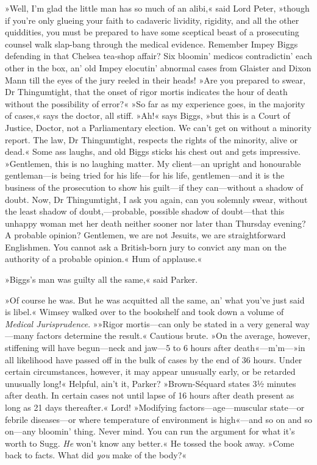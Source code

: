 »Well, I'm glad the little man has so much of an alibi,« said Lord Peter, »though if you're only glueing your faith to cadaveric lividity, rigidity, and all the other quiddities, you must be prepared to have some sceptical beast of a prosecuting counsel walk slap-bang through the medical evidence. Remember Impey Biggs defending in that Chelsea tea-shop affair? Six bloomin' medicos contradictin' each other in the box, an' old Impey elocutin' abnormal cases from Glaister and Dixon Mann till the eyes of the jury reeled in their heads! »Are you prepared to swear, Dr Thingumtight, that the onset of rigor mortis indicates the hour of death without the possibility of error?« »So far as my experience goes, in the majority of cases,« says the doctor, all stiff. »Ah!« says Biggs, »but this is a Court of Justice, Doctor, not a Parliamentary election. We can't get on without a minority report. The law, Dr Thingumtight, respects the rights of the minority, alive or dead.« Some ass laughs, and old Biggs sticks his chest out and gets impressive. »Gentlemen, this is no laughing matter. My client—an upright and honourable gentleman—is being tried for his life—for his life, gentlemen—and it is the business of the prosecution to show his guilt—if they can—without a shadow of doubt. Now, Dr Thingumtight, I ask you again, can you solemnly swear, without the least shadow of doubt,---probable, possible shadow of doubt—that this unhappy woman met her death neither sooner nor later than Thursday evening? A probable opinion? Gentlemen, we are not Jesuits, we are straightforward Englishmen. You cannot ask a British-born jury to convict any man on the authority of a probable opinion.« Hum of applause.«

»Biggs's man was guilty all the same,« said Parker.

»Of course he was. But he was acquitted all the same, an' what you've just said is libel.« Wimsey walked over to the bookshelf and took down a volume of \textit{Medical Jurisprudence}. »»Rigor mortis—can only be stated in a very general way—many factors determine the result.« Cautious brute. »On the average, however, stiffening will have begun—neck and jaw—5 to 6 hours after death«---m'm---»in all likelihood have passed off in the bulk of cases by the end of 36 hours. Under certain circumstances, however, it may appear unusually early, or be retarded unusually long!« Helpful, ain't it, Parker? »Brown-Séquard states \textellipsis 3½ minutes after death\textellipsis . In certain cases not until lapse of 16 hours after death \textellipsis present as long as 21 days thereafter.« Lord! »Modifying factors—age—muscular state—or febrile diseases—or where temperature of environment is high«---and so on and so on—any bloomin' thing. Never mind. You can run the argument for what it's worth to Sugg. \textit{He} won't know any better.« He tossed the book away. »Come back to facts. What did \textit{you} make of the body?«


